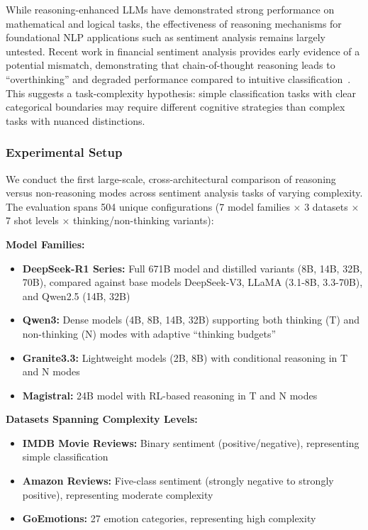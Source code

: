 While reasoning-enhanced LLMs have demonstrated strong performance on mathematical and logical tasks, the effectiveness of reasoning mechanisms for foundational NLP applications such as sentiment analysis remains largely untested. Recent work in financial sentiment analysis provides early evidence of a potential mismatch, demonstrating that chain-of-thought reasoning leads to ``overthinking'' and degraded performance compared to intuitive classification~\cite{li2025financial}. This suggests a task-complexity hypothesis: simple classification tasks with clear categorical boundaries may require different cognitive strategies than complex tasks with nuanced distinctions.

\subsubsection{Experimental Setup}

We conduct the first large-scale, cross-architectural comparison of reasoning versus non-reasoning modes across sentiment analysis tasks of varying complexity. The evaluation spans 504 unique configurations (7 model families $\times$ 3 datasets $\times$ 7 shot levels $\times$ thinking/non-thinking variants):

\textbf{Model Families:}
\begin{itemize}[leftmargin=*]
    \item \textbf{DeepSeek-R1 Series:} Full 671B model and distilled variants (8B, 14B, 32B, 70B), compared against base models DeepSeek-V3, LLaMA (3.1-8B, 3.3-70B), and Qwen2.5 (14B, 32B)
    \item \textbf{Qwen3:} Dense models (4B, 8B, 14B, 32B) supporting both thinking (T) and non-thinking (N) modes with adaptive ``thinking budgets''
    \item \textbf{Granite3.3:} Lightweight models (2B, 8B) with conditional reasoning in T and N modes
    \item \textbf{Magistral:} 24B model with RL-based reasoning in T and N modes
\end{itemize}

\textbf{Datasets Spanning Complexity Levels:}
\begin{itemize}[leftmargin=*]
    \item \textbf{IMDB Movie Reviews:} Binary sentiment (positive/negative), representing simple classification
    \item \textbf{Amazon Reviews:} Five-class sentiment (strongly negative to strongly positive), representing moderate complexity
    \item \textbf{GoEmotions:} 27 emotion categories, representing high complexity
\end{itemize}


